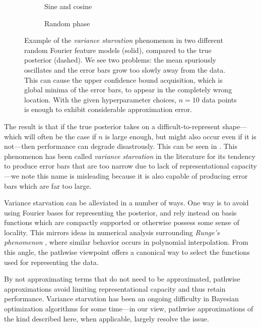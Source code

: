 \documentclass[11pt]{book}
\begin{document}
\begin{figure}
\begin{subfigure}{0.49\textwidth}

\caption{Sine and cosine}
\end{subfigure}
\begin{subfigure}{0.49\textwidth}

\caption{Random phase}
\end{subfigure}
\caption{Example of the \emph{variance starvation} phenomenon in two different random Fourier feature models (solid), compared to the true posterior (dashed).
We see two problems: the mean spuriously oscillates and the error bars grow too slowly away from the data.
This can cause the upper confidence bound acquisition, which is global minima of the error bars, to appear in the completely wrong location.
With the given hyperparameter choices, $n=10$ data points is enough to exhibit considerable approximation error.}
\label{fig:gp-vs}
\end{figure}

The result is that if the true posterior takes on a difficult-to-represent shape---which will often be the case if $n$ is large enough, but might also occur even if it is not---then performance can degrade disastrously.
This can be seen in .
This phenomenon has been called \emph{variance starvation} \cite{wang18,mutny18} in the literature for its tendency to produce error bars that are too narrow due to lack of representational capacity---we note this name is misleading because it is also capable of producing error bars which are far too large.

Variance starvation can be alleviated in a number of ways.
One way is to avoid using Fourier bases for representing the posterior, and rely instead on basis functions which are compactly supported or otherwise possess some sense of locality.
This mirrors ideas in numerical analysis surrounding \emph{Runge's phenomenon} \cite{epperson87,dahlquist08}, where similar behavior occurs in polynomial interpolation.
From this angle, the pathwise viewpoint offers a canonical way to select the functions used for representing the data.

By not approximating terms that do not need to be approximated, pathwise approximations avoid limiting representational capacity and thus retain performance.
Variance starvation has been an ongoing difficulty in Bayesian optimization algorithms for some time---in our view, pathwise approximations of the kind described here, when applicable, largely resolve the issue.
\end{document}
